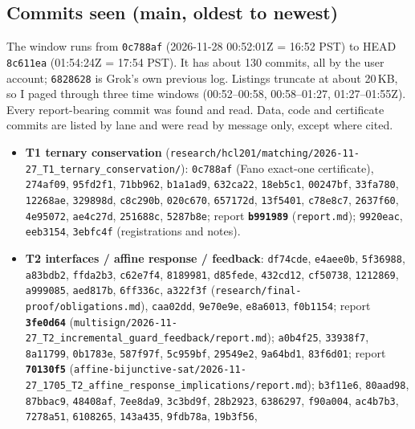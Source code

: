 \documentclass[11pt]{article}
\theoremstyle{definition}
\theoremstyle{remark}
\begin{document}
\subsection{Commits seen (main, oldest to newest)}
The window runs from \texttt{0c788af} (2026-11-28 00:52:01Z = 16:52 PST) to HEAD
\texttt{8c611ea} (01:54:24Z = 17:54 PST). It has about 130 commits, all by the user
account; \texttt{6828628} is Grok's own previous log. Listings truncate at about 20\,KB,
so I paged through three time windows (00:52--00:58, 00:58--01:27, 01:27--01:55Z). Every
report-bearing commit was found and read. Data, code and certificate commits are listed
by lane and were read by message only, except where cited.
\begin{itemize}
\item \textbf{T1 ternary conservation} (\texttt{research/hcl201/matching/2026-11-27\_T1\_ternary\_conservation/}):
\texttt{0c788af} (Fano exact-one certificate), \texttt{274af09}, \texttt{95fd2f1},
\texttt{71bb962}, \texttt{b1a1ad9}, \texttt{632ca22}, \texttt{18eb5c1}, \texttt{00247bf},
\texttt{33fa780}, \texttt{12268ae}, \texttt{329898d}, \texttt{c8c290b}, \texttt{020c670},
\texttt{657172d}, \texttt{13f5401}, \texttt{c78e8c7}, \texttt{2637f60}, \texttt{4e95072},
\texttt{ae4c27d}, \texttt{251688c}, \texttt{5287b8e}; report \textbf{\texttt{b991989}}
(\texttt{report.md}); \texttt{9920eac}, \texttt{eeb3154}, \texttt{3ebfc4f}
(registrations and notes).
\item \textbf{T2 interfaces / affine response / feedback}: \texttt{df74cde},
\texttt{e4aee0b}, \texttt{5f36988}, \texttt{a83bdb2}, \texttt{ffda2b3}, \texttt{c62e7f4},
\texttt{8189981}, \texttt{d85fede}, \texttt{432cd12}, \texttt{cf50738}, \texttt{1212869},
\texttt{a999085}, \texttt{aed817b}, \texttt{6ff336c}, \texttt{a322f3f}
(\texttt{research/final-proof/obligations.md}), \texttt{caa02dd}, \texttt{9e70e9e},
\texttt{e8a6013}, \texttt{f0b1154}; report \textbf{\texttt{3fe0d64}}
(\texttt{multisign/2026-11-27\_T2\_incremental\_guard\_feedback/report.md});
\texttt{a0b4f25}, \texttt{33938f7}, \texttt{8a11799}, \texttt{0b1783e}, \texttt{587f97f},
\texttt{5c959bf}, \texttt{29549e2}, \texttt{9a64bd1}, \texttt{83f6d01}; report
\textbf{\texttt{70130f5}} (\texttt{affine-bijunctive-sat/2026-11-27\_1705\_T2\_affine\_response\_implications/report.md});
\texttt{b3f11e6}, \texttt{80aad98}, \texttt{87bbac9}, \texttt{48408af}, \texttt{7ee8da9},
\texttt{3c3bd9f}, \texttt{28b2923}, \texttt{6386297}, \texttt{f90a004}, \texttt{ac4b7b3},
\texttt{7278a51}, \texttt{6108265}, \texttt{143a435}, \texttt{9fdb78a}, \texttt{19b3f56},

\end{itemize}
\end{document}
